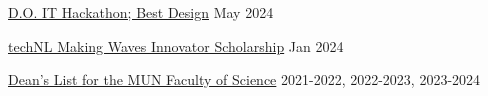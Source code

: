 \href{https://github.com/EthanDenny/do-it-hackathon}{D.O. IT Hackathon; Best Design} \hfill May 2024 \par
\href{https://technl.ca/}{techNL Making Waves Innovator Scholarship} \hfill Jan 2024 \par
\href{https://www.mun.ca/science/undergraduates/scholarships-and-awards/deans-list/}{Dean's List for the MUN Faculty of Science} \hfill 2021-2022, 2022-2023, 2023-2024 \par
